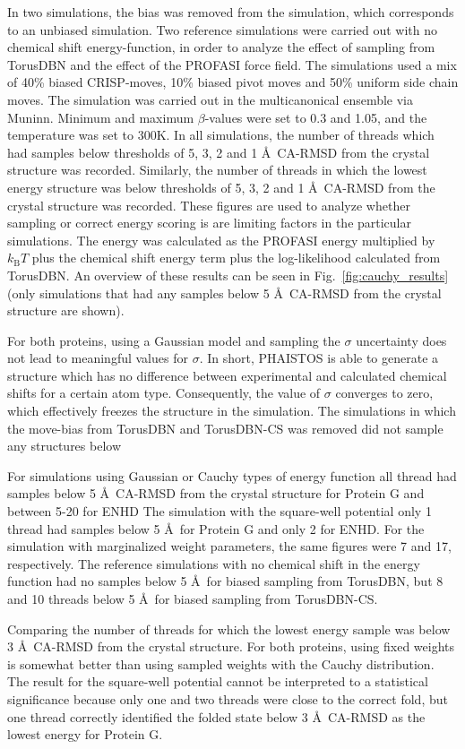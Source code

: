 In two simulations, the bias was removed from the simulation, which corresponds to an unbiased simulation.
Two reference simulations were carried out with no chemical shift energy-function, in order to analyze the effect of sampling from TorusDBN and the effect of the PROFASI force field.
The simulations used a mix of 40\% biased CRISP-moves, 10\% biased pivot moves and 50\% uniform side chain moves.
The simulation was carried out in the multicanonical ensemble via Muninn.
Minimum and maximum $\beta$-values were set to 0.3 and 1.05, and the temperature was set to 300K.
In all simulations, the number of threads which had samples below thresholds of 5, 3, 2 and 1 \AA~CA-RMSD from the crystal structure was recorded.
Similarly, the number of threads in which the lowest energy structure was below thresholds of 5, 3, 2 and 1 \AA~CA-RMSD from the crystal structure was recorded.
These figures are used to analyze whether sampling or correct energy scoring is are limiting factors in the particular simulations.
The energy was calculated as the PROFASI energy multiplied by $k_{\mathrm{B}}T$ plus the chemical shift energy term plus the log-likelihood calculated from TorusDBN.
An overview of these results can be seen in Fig.~\ref{fig:cauchy_results} (only simulations that had any samples below 5 \AA~CA-RMSD from the crystal structure are shown).

For both proteins, using a Gaussian model and sampling the $\sigma$ uncertainty does not lead to meaningful values for $\sigma$.
In short, PHAISTOS is able to generate a structure which has no difference between experimental and calculated chemical shifts for a certain atom type.
Consequently, the value of $\sigma$ converges to zero, which effectively freezes the structure in the simulation.
The simulations in which the move-bias from TorusDBN and TorusDBN-CS was removed did not sample any structures below 

For simulations using Gaussian or Cauchy types of energy function all thread had samples below 5 \AA~CA-RMSD from the crystal structure for Protein G and between 5-20 for ENHD 
The simulation with the square-well potential only 1 thread had samples below 5 \AA~for Protein G  and only 2 for ENHD. 
For the simulation with marginalized weight parameters, the same figures were 7 and 17, respectively.
The reference simulations with no chemical shift in the energy function had no samples below 5 \AA~for biased sampling from TorusDBN, but 8 and 10 threads below 5 \AA~for biased sampling from TorusDBN-CS.

Comparing the number of threads for which the lowest energy sample was below 3 \AA~CA-RMSD from the crystal structure.
For both proteins, using fixed weights is somewhat better than using sampled weights with the Cauchy distribution.
The result for the square-well potential cannot be interpreted to a statistical significance because only one and two threads were close to the correct fold, but one thread correctly identified the folded state below 3 \AA~CA-RMSD as the lowest energy for Protein G.

